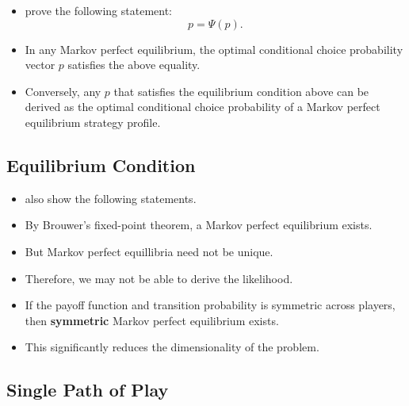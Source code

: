 \documentclass[
]{book}
\providecommand{\tightlist}{%
  \setlength{\itemsep}{0pt}\setlength{\parskip}{0pt}}
\begin{document}
\begin{itemize}
\tightlist
\item
  \citet{pesendorferAsymptoticLeastSquares2008} prove the following
  statement: \begin{equation}
  p = \Psi(p).
  \end{equation}
\item
  In any Markov perfect equilibrium, the optimal conditional choice
  probability vector \(p\) satisfies the above equality.
\item
  Conversely, any \(p\) that satisfies the equilibrium condition above
  can be derived as the optimal conditional choice probability of a
  Markov perfect equilibrium strategy profile.
\end{itemize}

\hypertarget{equilibrium-condition-2}{%
\subsection{Equilibrium Condition}\label{equilibrium-condition-2}}

\begin{itemize}
\tightlist
\item
  \citet{pesendorferAsymptoticLeastSquares2008} also show the following
  statements.
\item
  By Brouwer's fixed-point theorem, a Markov perfect equilibrium
  exists.
\item
  But Markov perfect equillibria need not be unique.
\item
  Therefore, we may not be able to derive the likelihood.
\item
  If the payoff function and transition probability is symmetric
  across players, then \textbf{symmetric} Markov perfect equilibrium
  exists.
\item
  This significantly reduces the dimensionality of the problem.
\end{itemize}

\hypertarget{single-path-of-play}{%
\subsection{Single Path of Play}\label{single-path-of-play}}
\end{document}
